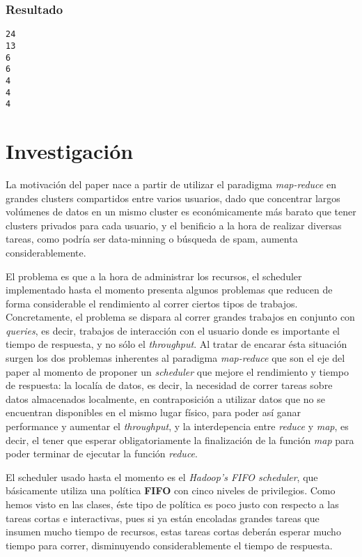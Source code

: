 \documentclass[a4paper]{article}
\begin{document}
\subsubsection{Resultado}
\begin{verbatim}
24
13
6
6
4
4
4
\end{verbatim}

\newpage
\section{Investigación}

La motivación del paper nace a partir de utilizar el paradigma
\textit{map-reduce} en grandes clusters compartidos entre varios usuarios, dado
que concentrar largos volúmenes de datos en un mismo cluster es económicamente
más barato que tener clusters privados para cada usuario, y el benificio a la
hora de realizar diversas tareas, como podría ser data-minning o búsqueda de
spam, aumenta considerablemente.

El problema es que a la hora de administrar los recursos, el scheduler
implementado hasta el momento presenta algunos problemas que reducen de forma
considerable el rendimiento al correr ciertos tipos de trabajos. Concretamente,
el problema se dispara al correr grandes trabajos en conjunto con
\textit{queries}, es decir, trabajos de interacción con el usuario donde es
importante el tiempo de respuesta, y no sólo el \textit{throughput}. Al tratar
de encarar ésta situación surgen los dos problemas inherentes al paradigma
\textit{map-reduce} que son el eje del paper al momento de proponer un
\textit{scheduler} que mejore el rendimiento y tiempo de respuesta: la
localía de datos, es decir, la necesidad de correr tareas sobre datos
almacenados localmente, en contraposición a utilizar datos que no se encuentran
disponibles en el mismo lugar físico, para poder así ganar performance y
aumentar el \textit{throughput}, y la interdepencia entre \textit{reduce} y
\textit{map}, es decir, el tener que esperar obligatoriamente la finalización
de la función \textit{map} para poder terminar de ejecutar la función
\textit{reduce}.

El scheduler usado hasta el momento es el \textit{Hadoop's FIFO scheduler}, que
básicamente utiliza una política \textbf{FIFO} con cinco niveles de
privilegios.  Como hemos visto en las clases, éste tipo de política es poco
justo con respecto a las tareas cortas e interactivas, pues si ya están
encoladas grandes tareas que insumen mucho tiempo de recursos, estas tareas
cortas deberán esperar mucho tiempo para correr, disminuyendo considerablemente
el tiempo de respuesta.
\end{document}
